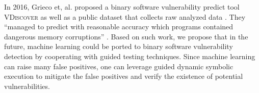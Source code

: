 In 2016, Grieco et, al. proposed a binary software vulnerability predict tool \textsc{VDiscover} as well as a public dataset that collects raw analyzed data \cite{Grieco:2016:TLV}. 
 They ``managed to predict with reasonable accuracy which programs contained dangerous memory corruptions'' \cite{Grieco:2016:TLV}.
 Based on such work, we propose that in the future, machine learning could be ported to binary software vulnerability detection by cooperating with guided testing techniques. Since machine learning can raise many false positives, one can leverage guided dynamic symbolic execution to mitigate the false positives and verify the existence of potential vulnerabilities.